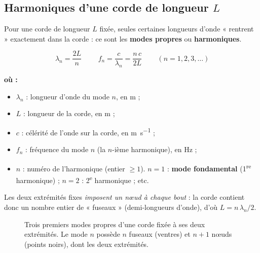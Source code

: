 \documentclass[11pt,a4paper]{article}
\newenvironment{ou}{%
  \par\smallskip\noindent\textbf{où :}\nopagebreak
  \begin{itemize}[leftmargin=1.8em,topsep=2pt,itemsep=1.5pt,parsep=0pt]}%
  {\end{itemize}}
\begin{document}
\subsection{Harmoniques d'une corde de longueur \texorpdfstring{$L$}{L}}

Pour une corde de longueur $L$ fixée, seules certaines longueurs d'onde « rentrent » exactement
dans la corde : ce sont les \textbf{modes propres} ou \textbf{harmoniques}.

\begin{formule}
\[ \boxed{\,\lambda_n = \frac{2L}{n}\,}\qquad
   \boxed{\,f_n = \frac{c}{\lambda_n} = \frac{n\,c}{2L}\,}\qquad (n = 1,2,3,\dots) \]
\begin{ou}
  \item $\lambda_n$ : longueur d'onde du mode $n$, en \si{\metre} ;
  \item $L$ : longueur de la corde, en \si{\metre} ;
  \item $c$ : célérité de l'onde sur la corde, en \si{\metre\per\second} ;
  \item $f_n$ : fréquence du mode $n$ (la $n$-ième harmonique), en \si{\hertz} ;
  \item $n$ : numéro de l'harmonique (entier $\ge 1$). $n=1$ : \textbf{mode fondamental}
        (1\textsuperscript{re} harmonique) ; $n=2$ : 2\textsuperscript{e} harmonique ; etc.
\end{ou}
Les deux extrémités fixes \emph{imposent un nœud à chaque bout} : la corde contient donc un
nombre entier de « fuseaux » (demi-longueurs d'onde), d'où $L = n\,\lambda_n/2$.
\end{formule}

\begin{figure}[h]
\centering
{}
\caption{Trois premiers modes propres d'une corde fixée à ses deux extrémités. Le mode $n$
possède $n$ fuseaux (ventres) et $n+1$ nœuds (points noirs), dont les deux extrémités.}
\label{fig:harmoniques}
\end{figure}
\end{document}
